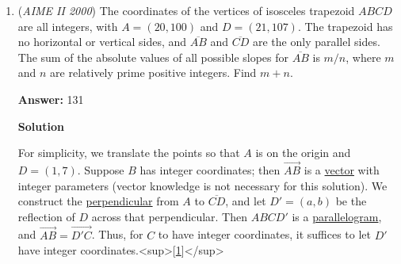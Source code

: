 \begin{enumerate}
 



\textbf{Solution 3 (Smart algebra to make 2 less annoying)}

Using the formulas established in solution 2, one notices:
 \[r^2=\frac{A^2}{(a+b+c+d)^2}\]
 \[r^2=\frac{(a+b+c+d)(abc+bcd+cda+abd) }{(a+b+c+d)^2}\]
 \[r^2=\frac{abc+bcd+acd+abd}{a+b+c+d}\]
 \[r^2=\boxed{647}\]

 which is nowhere near as hard of a calculation. In fact, this is basically the same exact calculation done at the end of solution 1, just with less opportunity to cancel coefficients beforehand.

 



\textbf{Solution 4 (Alternate Solution 2)}

The area of a tangential quadrilateral using side and tangential lengths is $K = \sqrt{(abcd) - (eg-fh)^2}$, where $a$, $b$, $c$, and $d$ are the side lengths, and $e$, $f$, $g$, $h$, the tangential lengths. Then, say $e = 19$, $f= 26$, $g = 37$, and $h = 23$, the lengths $a = 45$, $b = 63$, $c = 60$, and $d = 42$. Note that $K = \sqrt{7144200 - 11025} = \sqrt{7133175} = 105\sqrt{647}$.

 Then, use $K = rs$ with $s = \frac{a+b+c+d}{2} = \frac{210}{2} = 105$. Then, $r$ is $\sqrt{647}$, squared is $\boxed{647}$.

 


	\item (\textit{AIME II 2000}) The coordinates of the vertices of isosceles trapezoid $ABCD$ are all integers, with $A=(20,100)$ and $D=(21,107)$. The trapezoid has no horizontal or vertical sides, and $\overline{AB}$ and $\overline{CD}$ are the only parallel sides. The sum of the absolute values of all possible slopes for $\overline{AB}$ is $m/n$, where $m$ and $n$ are relatively prime positive integers. Find $m+n$.


 
 \textbf{Answer: }131



\textbf{Solution}

For simplicity, we translate the points so that $A$ is on the origin and $D = (1,7)$. Suppose $B$ has integer coordinates; then $\overrightarrow{AB}$ is a \href{https://artofproblemsolving.com/wiki/index.php?title=Vector}{vector} with integer parameters (vector knowledge is not necessary for this solution). We construct the \href{https://artofproblemsolving.com/wiki/index.php?title=Perpendicular}{perpendicular} from $A$ to $\overline{CD}$, and let $D' = (a,b)$ be the reflection of $D$ across that perpendicular. Then $ABCD'$ is a \href{https://artofproblemsolving.com/wiki/index.php?title=Parallelogram}{parallelogram}, and $\overrightarrow{AB} = \overrightarrow{D'C}$. Thus, for $C$ to have integer coordinates, it suffices to let $D'$ have integer coordinates.<sup>[\href{https://artofproblemsolving.com\#note\_1}{1}]</sup>


\end{enumerate}
